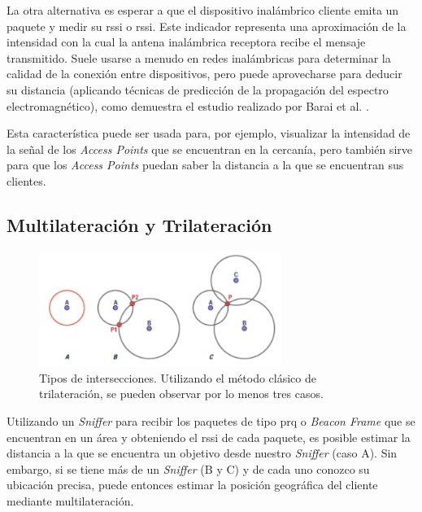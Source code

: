 La otra alternativa es esperar a que el dispositivo inalámbrico cliente emita un paquete y medir su \acl{rssi} o \acs{rssi}. Este indicador representa una aproximación de la intensidad con la cual la antena inalámbrica receptora recibe el mensaje transmitido. Suele usarse a menudo en redes inalámbricas para determinar la calidad de la conexión entre dispositivos, pero puede aprovecharse para deducir su distancia (aplicando técnicas de predicción de la propagación del espectro electromagnético), como demuestra el estudio realizado por Barai et al. \cite{Barai2017EstimateDM}.

 Esta característica puede ser usada para, por ejemplo, visualizar la intensidad de la señal de los \emph{Access Point}\textit{s} que se encuentran en la cercanía, pero también sirve para que los \emph{Access Point}\textit{s} puedan saber la distancia a la que se encuentran sus clientes.

 

\subsection{Multilateración y Trilateración}

\begin{figure}[!htb]
	\centering
	\includegraphics[width=0.7\textwidth]{Figuras/fig4.png}
	\captionsetup{margin=2cm}
	\caption[Casos Trilateración]{ Tipos de intersecciones. Utilizando el método clásico de trilateración, se pueden observar por lo menos tres casos.}
	\label{fig:tri}
\end{figure}

 Utilizando un \emph{Sniffer} para recibir los paquetes de tipo \acl{prq} o \emph{Beacon Frame} que se encuentran en un área y obteniendo el \acs{rssi} de cada paquete, es posible estimar la distancia a la que se encuentra un objetivo desde nuestro \emph{Sniffer} (caso A). Sin embargo, si se tiene más de un \emph{Sniffer} (B y C) y de cada uno conozco su ubicación precisa, puede entonces estimar la posición geográfica del cliente mediante multilateración.

